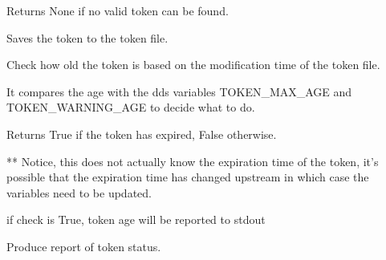 \documentclass[letterpaper,10pt,english]{sphinxmanual}
\begin{document}
\begin{fulllineitems}
\begin{fulllineitems}
\sphinxAtStartPar
Returns None if no valid token can be found.

\end{fulllineitems}


\begin{fulllineitems}
\label{\detokenize{dds_cli:dds_cli.user.TokenFile.save_token}}
\sphinxAtStartPar
Saves the token to the token file.

\end{fulllineitems}


\begin{fulllineitems}
\label{\detokenize{dds_cli:dds_cli.user.TokenFile.token_expired}}
\sphinxAtStartPar
Check how old the token is based on the modification time of the token file.

\sphinxAtStartPar
It compares the age with the dds variables TOKEN\_MAX\_AGE and TOKEN\_WARNING\_AGE to decide
what to do.

\sphinxAtStartPar
Returns True if the token has expired, False otherwise.

\sphinxAtStartPar
** Notice, this does not actually know the expiration time of the token, it’s possible that the
expiration time has changed upstream in which case the variables need to be updated.

\sphinxAtStartPar
if check is True, token age will be reported to stdout

\end{fulllineitems}


\begin{fulllineitems}
\label{\detokenize{dds_cli:dds_cli.user.TokenFile.token_report}}
\sphinxAtStartPar
Produce report of token status.

\end{fulllineitems}


\end{fulllineitems}
\end{document}
